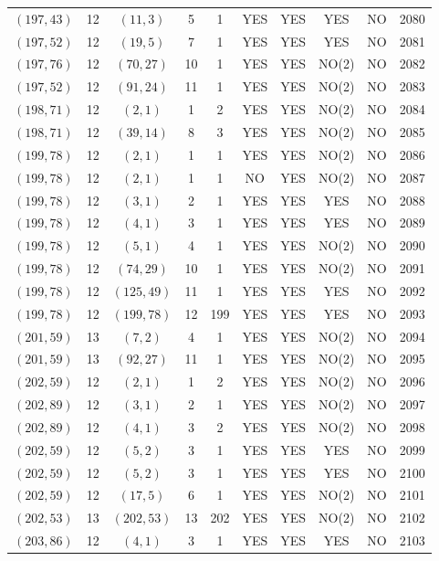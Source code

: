 \begin{longtable}{|c|c|c|c|c|c|c|c|c|c|}
$(197, 43)$ & 12 & $(11, 3)$ & 5 & 1 & YES & YES & YES & NO & 2080\\
$(197, 52)$ & 12 & $(19, 5)$ & 7 & 1 & YES & YES & YES & NO & 2081\\
$(197, 76)$ & 12 & $(70, 27)$ & 10 & 1 & YES & YES & NO(2) & NO & 2082\\
$(197, 52)$ & 12 & $(91, 24)$ & 11 & 1 & YES & YES & NO(2) & NO & 2083\\
$(198, 71)$ & 12 & $(2, 1)$ & 1 & 2 & YES & YES & NO(2) & NO & 2084\\
$(198, 71)$ & 12 & $(39, 14)$ & 8 & 3 & YES & YES & NO(2) & NO & 2085\\
$(199, 78)$ & 12 & $(2, 1)$ & 1 & 1 & YES & YES & NO(2) & NO & 2086\\
$(199, 78)$ & 12 & $(2, 1)$ & 1 & 1 & NO & YES & NO(2) & NO & 2087\\
$(199, 78)$ & 12 & $(3, 1)$ & 2 & 1 & YES & YES & YES & NO & 2088\\
$(199, 78)$ & 12 & $(4, 1)$ & 3 & 1 & YES & YES & YES & NO & 2089\\
$(199, 78)$ & 12 & $(5, 1)$ & 4 & 1 & YES & YES & NO(2) & NO & 2090\\
$(199, 78)$ & 12 & $(74, 29)$ & 10 & 1 & YES & YES & NO(2) & NO & 2091\\
$(199, 78)$ & 12 & $(125, 49)$ & 11 & 1 & YES & YES & YES & NO & 2092\\
$(199, 78)$ & 12 & $(199, 78)$ & 12 & 199 & YES & YES & YES & NO & 2093\\
$(201, 59)$ & 13 & $(7, 2)$ & 4 & 1 & YES & YES & NO(2) & NO & 2094\\
$(201, 59)$ & 13 & $(92, 27)$ & 11 & 1 & YES & YES & NO(2) & NO & 2095\\
$(202, 59)$ & 12 & $(2, 1)$ & 1 & 2 & YES & YES & NO(2) & NO & 2096\\
$(202, 89)$ & 12 & $(3, 1)$ & 2 & 1 & YES & YES & NO(2) & NO & 2097\\
$(202, 89)$ & 12 & $(4, 1)$ & 3 & 2 & YES & YES & NO(2) & NO & 2098\\
$(202, 59)$ & 12 & $(5, 2)$ & 3 & 1 & YES & YES & YES & NO & 2099\\
$(202, 59)$ & 12 & $(5, 2)$ & 3 & 1 & YES & YES & YES & NO & 2100\\
$(202, 59)$ & 12 & $(17, 5)$ & 6 & 1 & YES & YES & NO(2) & NO & 2101\\
$(202, 53)$ & 13 & $(202, 53)$ & 13 & 202 & YES & YES & NO(2) & NO & 2102\\
$(203, 86)$ & 12 & $(4, 1)$ & 3 & 1 & YES & YES & YES & NO & 2103\\

\end{longtable}
